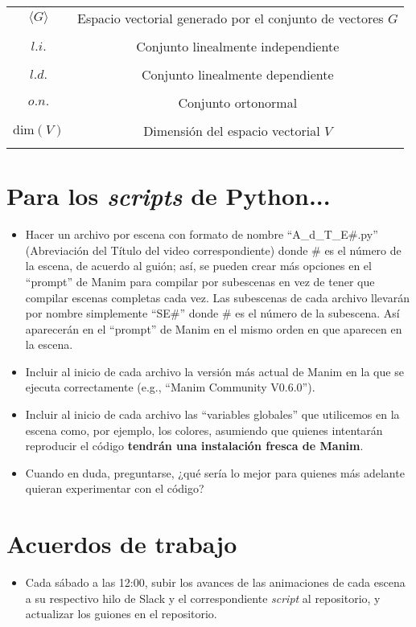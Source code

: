 \documentclass[12pt,dvipsnames]{article}
\numberwithin{equation}{section}
\begin{document}
\begin{tcolorbox}
\begin{tabular}{cc}
    $\langle G \rangle$ & Espacio vectorial generado por el conjunto de vectores $G$ \\ \\
    $l.i.$ & Conjunto linealmente independiente \\ \\
    $l.d.$ & Conjunto linealmente dependiente \\ \\
    $o.n.$ & Conjunto ortonormal \\ \\
    $\text{dim}(V)$ & Dimensión del espacio vectorial $V$ \\ \\

\end{tabular}
\end{tcolorbox}

\section{Para los \emph{scripts} de Python...}

\begin{itemize}
    \item Hacer un archivo por escena con formato de nombre ``A\_d\_T\_E\#.py'' (Abreviación del Título del video correspondiente) donde \# es el número de la escena, de acuerdo al guión; así, se pueden crear más opciones en el ``prompt'' de Manim para compilar por subescenas en vez de tener que compilar escenas completas cada vez. Las subescenas de cada archivo llevarán por nombre simplemente ``SE\#'' donde \# es el número de la subescena. Así aparecerán en el ``prompt'' de Manim en el mismo orden en que aparecen en la escena.

    \item Incluir al inicio de cada archivo la versión más actual de Manim en la que se ejecuta correctamente (e.g., ``Manim Community V0.6.0'').
    
    \item Incluir al inicio de cada archivo las ``variables globales'' que utilicemos en la escena como, por ejemplo, los colores, asumiendo que quienes intentarán reproducir el código \textbf{tendrán una instalación fresca de Manim}.
    
    \item Cuando en duda, preguntarse, ¿qué sería lo mejor para quienes más adelante quieran experimentar con el código?
    
\end{itemize}

\section{Acuerdos de trabajo}

\begin{itemize}
    \item Cada sábado a las 12:00, subir los avances de las animaciones de cada escena a su respectivo hilo de Slack y el correspondiente \emph{script} al repositorio, y actualizar los guiones en el repositorio.
\end{itemize}
\end{document}
